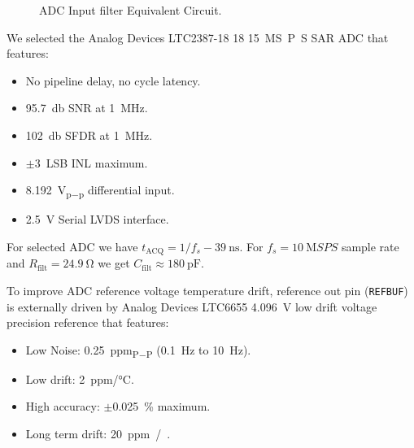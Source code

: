 \begin{figure}[ht]
  \centering
  
  \caption{ADC Input filter Equivalent Circuit.}
  \label{fig:filter}
\end{figure}

We selected the Analog Devices LTC2387-18 \SI{18}{\bit} \SI{15}{\mega S P S} SAR ADC that features:

\begin{itemize}
    \item No pipeline delay, no cycle latency.
    \item \SI{95.7}{\decibel} SNR at \SI{1}{\mega\hertz}.
    \item \SI{102}{\decibel} SFDR at \SI{1}{\mega\hertz}.
    \item $\pm$\SI{3}{LSB} INL maximum.
    \item \SI{8.192}{\volt_{p-p}} differential input.
    \item \SI{2.5}{\volt} Serial LVDS interface.
\end{itemize}

For selected ADC we have $t_\text{ACQ} = 1/f_s -\SI{39}{\nano\second}$. For $f_s = \SI{10}{\mega SPS}$ sample rate and $R_\text{filt}=\SI{24.9}{\ohm}$ we get $C_\text{filt}\approx \SI{180}{\pico\farad}$.

To improve ADC reference voltage temperature drift,  reference out pin (\texttt{REFBUF}) is externally driven by Analog Devices LTC6655 \SI{4.096}{\volt} low drift voltage precision reference that features:

\begin{itemize}
  \item Low Noise: \SI{0.25}{ppm_{P-P}} (\SI{0.1}{\hertz} to \SI{10}{\hertz}).
  \item Low drift: \SI{2}{ppm/\degreeCelsius}.
  \item High accuracy: $\pm$\SI{0.025}{\percent} maximum.
  \item Long term drift: \SI{20}{ppm /\sqrtunit{\kilo\hour}}.
\end{itemize}
